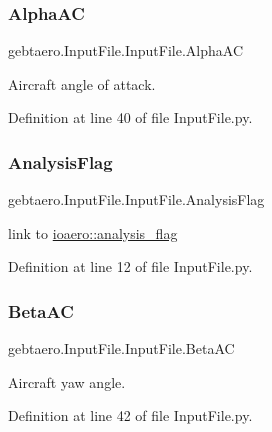 \subsubsection{\texorpdfstring{Alpha\+AC}{AlphaAC}}
{\footnotesize\ttfamily gebtaero.\+Input\+File.\+Input\+File.\+Alpha\+AC}



Aircraft angle of attack. 



Definition at line 40 of file Input\+File.\+py.

\mbox{\label{classgebtaero_1_1_input_file_1_1_input_file_a5e345411ff4b135151d46eaa96fd5b82}} 
\subsubsection{\texorpdfstring{Analysis\+Flag}{AnalysisFlag}}
{\footnotesize\ttfamily gebtaero.\+Input\+File.\+Input\+File.\+Analysis\+Flag}



link to \hyperlink{namespaceioaero_a435527b09d62e7aac9883e1a6d6f3438}{ioaero\+::analysis\+\_\+flag} 



Definition at line 12 of file Input\+File.\+py.

\mbox{\label{classgebtaero_1_1_input_file_1_1_input_file_a20868cef3eeb8d6c140d62d2d2252657}} 
\subsubsection{\texorpdfstring{Beta\+AC}{BetaAC}}
{\footnotesize\ttfamily gebtaero.\+Input\+File.\+Input\+File.\+Beta\+AC}



Aircraft yaw angle. 



Definition at line 42 of file Input\+File.\+py.

